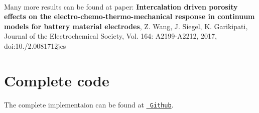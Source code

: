    ~\newline
 

Many more results can be found at paper\+: {\bfseries{Intercalation driven porosity effects on the electro-\/chemo-\/thermo-\/mechanical response in continuum models for battery material electrodes}}, Z. Wang, J. Siegel, K. Garikipati, Journal of the Electrochemical Society, Vol. 164\+: A2199-\/\+A2212, 2017, doi\+:10./2.0081712jes \hypertarget{brain_morph_com}{}\section{Complete code}\label{brain_morph_com}
The complete implementaion can be found at \href{https://github.com/mechanoChem/mechanoChemFEM/tree/example/Battery%20model%20at%20electrode%20scale}{\texttt{ Github}}. 